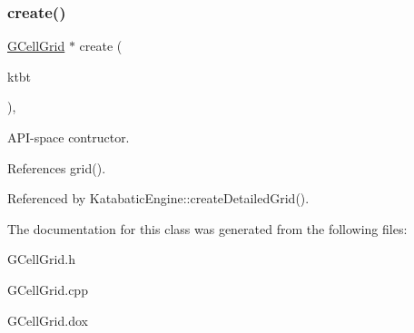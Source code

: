 \subsubsection{\texorpdfstring{create()}{create()}}
{\footnotesize\ttfamily \mbox{\hyperlink{classKatabatic_1_1GCellGrid}{G\+Cell\+Grid}} $\ast$ create (\begin{DoxyParamCaption}\item[{\mbox{\hyperlink{classKatabatic_1_1KatabaticEngine}{Katabatic\+Engine}} $\ast$}]{ktbt }\end{DoxyParamCaption})\hspace{0.3cm}{\ttfamily [static]}, {\ttfamily [protected]}}

A\+P\+I-\/space contructor. 

References grid().



Referenced by Katabatic\+Engine\+::create\+Detailed\+Grid().



The documentation for this class was generated from the following files\+:\begin{DoxyCompactItemize}
\item 
G\+Cell\+Grid.\+h\item 
G\+Cell\+Grid.\+cpp\item 
G\+Cell\+Grid.\+dox\end{DoxyCompactItemize}
